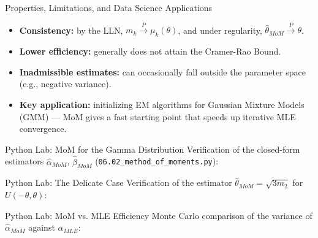 \documentclass[aspectratio=169,xcolor={dvipsnames,table}]{beamer}
\begin{document}
\begin{frame}{Properties, Limitations, and Data Science Applications}
	\vspace{-0.1cm}
	\begin{itemize}\itemsep=0.1cm
		\item \textbf{Consistency:} by the LLN, $m_k\xrightarrow{P}\mu_k(\theta)$, and under regularity, $\hat\theta_{MoM}\xrightarrow{P}\theta$. \pause
		\item \textbf{Lower efficiency:} generally does not attain the Cramer-Rao Bound. \pause
		\item \textbf{Inadmissible estimates:} can occasionally fall outside the parameter space (e.g., negative variance). \pause
		\item \textbf{Key application:} initializing EM algorithms for Gaussian Mixture Models (GMM) --- MoM gives a fast starting point that speeds up iterative MLE convergence.
	\end{itemize}
\end{frame}

\begin{frame}[fragile]{Python Lab: MoM for the Gamma Distribution}
	\vspace{-0.05cm}
	\scriptsize
	Verification of the closed-form estimators $\hat\alpha_{MoM}$, $\hat\beta_{MoM}$ (\texttt{06.02\_method\_of\_moments.py}):
	{
	}
\end{frame}

\begin{frame}[fragile]{Python Lab: The Delicate Case}
	\vspace{-0.05cm}
	\scriptsize
	Verification of the estimator $\hat\theta_{MoM}=\sqrt{3m_2}$ for $U(-\theta,\theta)$:
	{
	}
\end{frame}

\begin{frame}[fragile]{Python Lab: MoM vs. MLE Efficiency}
	\vspace{-0.05cm}
	\scriptsize
	Monte Carlo comparison of the variance of $\hat\alpha_{MoM}$ against $\hat\alpha_{MLE}$:
	{
	}
\end{frame}
\end{document}

